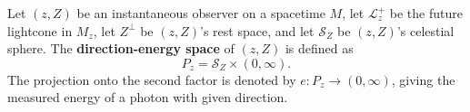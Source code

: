 Let $(z, Z)$ be an instantaneous observer on a spacetime $M$, let $\mathcal{L}_z^+$ be the future lightcone in $M_z$, let $Z^\perp$ be $(z, Z)$'s rest space, and let $\mathcal{S}_Z$ be $(z, Z)$'s celestial sphere. The \textbf{direction-energy space} of $(z, Z)$ is defined as
$$
P_z = \mathcal{S}_Z \times (0, \infty).
$$
The projection onto the second factor is denoted by $e: P_z \to (0, \infty)$, giving the measured energy of a photon with given direction.
